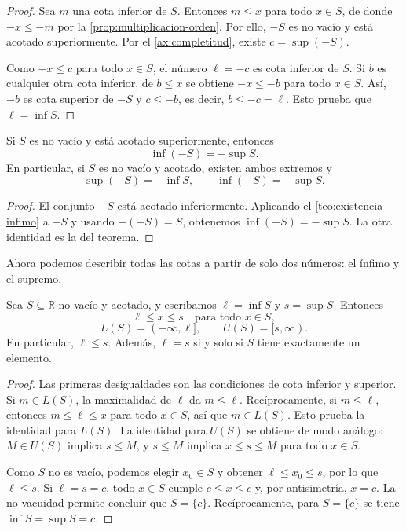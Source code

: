 \begin{proof}
Sea $m$ una cota inferior de $S$. Entonces $m\leq x$ para todo $x\in S$, de donde $-x\leq-m$ por la \cref{prop:multiplicacion-orden}. Por ello, $-S$ es no vacío y está acotado superiormente. Por el \cref{ax:completitud}, existe $c=\sup(-S)$.

Como $-x\leq c$ para todo $x\in S$, el número $\ell=-c$ es cota inferior de $S$. Si $b$ es cualquier otra cota inferior, de $b\leq x$ se obtiene $-x\leq-b$ para todo $x\in S$. Así, $-b$ es cota superior de $-S$ y $c\leq-b$, es decir, $b\leq-c=\ell$. Esto prueba que $\ell=\inf S$.
\end{proof}

\begin{samepage}
\begin{corollary}
\label{cor:extremos-signo}
Si $S$ es no vacío y está acotado superiormente, entonces
\[
 \inf(-S)=-\sup S.
\]
En particular, si $S$ es no vacío y acotado, existen ambos extremos y
\[
 \sup(-S)=-\inf S,
 \qquad
 \inf(-S)=-\sup S.
\]
\end{corollary}
\end{samepage}

\begin{proof}
El conjunto $-S$ está acotado inferiormente. Aplicando el \cref{teo:existencia-infimo} a $-S$ y usando $-(-S)=S$, obtenemos $\inf(-S)=-\sup S$. La otra identidad es la del teorema.
\end{proof}

Ahora podemos describir todas las cotas a partir de solo dos números: el ínfimo y el supremo.

\begin{samepage}
\begin{proposition}
\label{prop:cotas-optimas}
Sea $S\subseteq\mathbb{R}$ no vacío y acotado, y escribamos $\ell=\inf S$ y $s=\sup S$. Entonces
\[
 \ell\leq x\leq s\quad\text{para todo }x\in S,
\]
\[
 L(S)=(-\infty,\ell],
 \qquad
 U(S)=[s,\infty).
\]
En particular, $\ell\leq s$. Además, $\ell=s$ si y solo si $S$ tiene exactamente un elemento.
\end{proposition}
\end{samepage}

\begin{proof}
Las primeras desigualdades son las condiciones de cota inferior y superior. Si $m\in L(S)$, la maximalidad de $\ell$ da $m\leq\ell$. Recíprocamente, si $m\leq\ell$, entonces $m\leq\ell\leq x$ para todo $x\in S$, así que $m\in L(S)$. Esto prueba la identidad para $L(S)$. La identidad para $U(S)$ se obtiene de modo análogo: $M\in U(S)$ implica $s\leq M$, y $s\leq M$ implica $x\leq s\leq M$ para todo $x\in S$.

Como $S$ no es vacío, podemos elegir $x_0\in S$ y obtener $\ell\leq x_0\leq s$, por lo que $\ell\leq s$. Si $\ell=s=c$, todo $x\in S$ cumple $c\leq x\leq c$ y, por antisimetría, $x=c$. La no vacuidad permite concluir que $S=\{c\}$. Recíprocamente, para $S=\{c\}$ se tiene $\inf S=\sup S=c$.
\end{proof}


